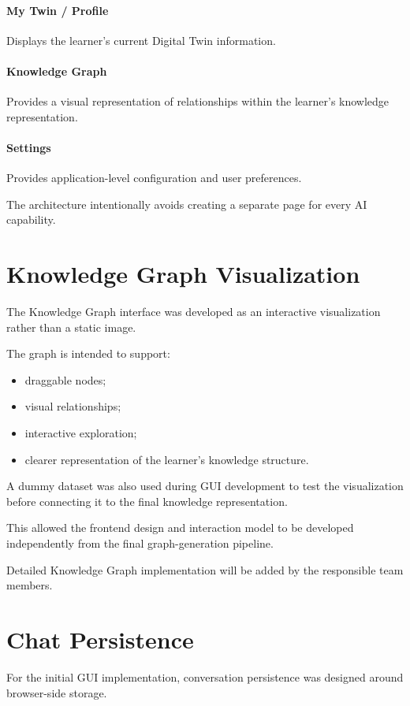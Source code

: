 \documentclass[12pt,a4paper]{article}
\begin{document}
\paragraph{My Twin / Profile} Displays the learner's current Digital Twin information.

\paragraph{Knowledge Graph} Provides a visual representation of relationships within the learner's knowledge representation.

\paragraph{Settings} Provides application-level configuration and user preferences.

The architecture intentionally avoids creating a separate page for every AI capability.

\section{Knowledge Graph Visualization}
The Knowledge Graph interface was developed as an interactive visualization rather than a static image.

The graph is intended to support:
\begin{itemize}[noitemsep,topsep=2pt]
    \item draggable nodes;
    \item visual relationships;
    \item interactive exploration;
    \item clearer representation of the learner's knowledge structure.
\end{itemize}

A dummy dataset was also used during GUI development to test the visualization before connecting it to the final knowledge representation.

This allowed the frontend design and interaction model to be developed independently from the final graph-generation pipeline.

Detailed Knowledge Graph implementation will be added by the responsible team members.

\section{Chat Persistence}
For the initial GUI implementation, conversation persistence was designed around browser-side storage.
\end{document}
